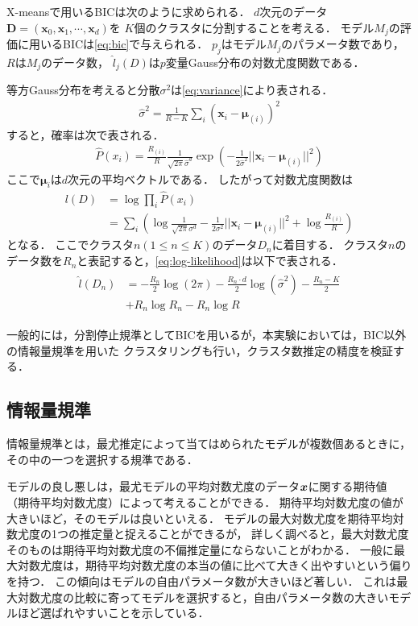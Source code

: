 X-meansで用いるBICは次のように求められる．
$d$次元のデータ${\bm D}=({\bm x_0}, {\bm x_1}, \cdots, {\bm x_d})$を
$K$個のクラスタに分割することを考える．
モデル$M_j$の評価に用いるBICは\eqref{eq:bic}で与えられる．
$p_j$はモデル$M_j$のパラメータ数であり，$R$は$M_j$のデータ数，
$\hat{l}_j(D)$は$p$変量Gauss分布の対数尤度関数である．

等方Gauss分布を考えると分散$\sigma^2$は\eqref{eq:variance}により表される．
\begin{align}
  \label{eq:variance}
  \hat{\sigma}^2 = \frac{1}{R-K}\sum_i\left({\bm x}_i-{\bm \mu}_{(i)}\right)^2
\end{align}
すると，確率は次で表される．
\begin{align}
  \label{eq:gaussian-distribution}
  \hat{P}(x_i) = \frac{R_{(i)}}{R}\frac{1}{\sqrt{2\pi}\hat{\sigma}^d}
    \exp\left(-\frac{1}{2\hat{\sigma}^2}||{\bm x}_i-{\bm \mu}_{(i)}||^2\right)
\end{align}
ここで${\bm \mu}_{i}$は$d$次元の平均ベクトルである．
したがって対数尤度関数は
\begin{align}
  \label{eq:log-likelihood}
  l(D) &= \log \prod_i \hat{P}(x_i) \\\nonumber
  &= \sum_i \left( \log\frac{1}{\sqrt{2\pi}\sigma^d}-\frac{1}{2\sigma^2}||{\bm x}_i-{\bm \mu}_{(i)}||^2 + \log\frac{R_{(i)}}{R} \right)
\end{align}
となる．
ここでクラスタ$n (1 \leq n \leq K)$のデータ$D_n$に着目する．
クラスタ$n$のデータ数を$R_n$と表記すると，\eqref{eq:log-likelihood}は以下で表される．
\begin{align}
  \begin{split}
    \hat{l}(D_n) &= -\frac{R_n}{2}\log(2\pi) - \frac{R_n \cdot d}{2}\log(\hat{\sigma}^2) -
    \frac{R_n - K}{2}\\ &
    + R_n\log R_n - R_n \log R
  \end{split}
\end{align}

一般的には，分割停止規準としてBICを用いるが，本実験においては，BIC以外の情報量規準を用いた
クラスタリングも行い，クラスタ数推定の精度を検証する．

\subsection{情報量規準}
情報量規準とは，最尤推定によって当てはめられたモデルが複数個あるときに，その中の一つを選択する規準である．

モデルの良し悪しは，最尤モデルの平均対数尤度のデータ$\boldsymbol{x}$に関する期待値
（期待平均対数尤度）によって考えることができる．
期待平均対数尤度の値が大きいほど，そのモデルは良いといえる．
モデルの最大対数尤度を期待平均対数尤度の1つの推定量と捉えることができるが，
詳しく調べると，最大対数尤度そのものは期待平均対数尤度の不偏推定量にならないことがわかる．
一般に最大対数尤度は，期待平均対数尤度の本当の値に比べて大きく出やすいという偏りを持つ．
この傾向はモデルの自由パラメータ数が大きいほど著しい．
これは最大対数尤度の比較に寄ってモデルを選択すると，自由パラメータ数の大きいモデルほど選ばれやすいことを示している．

